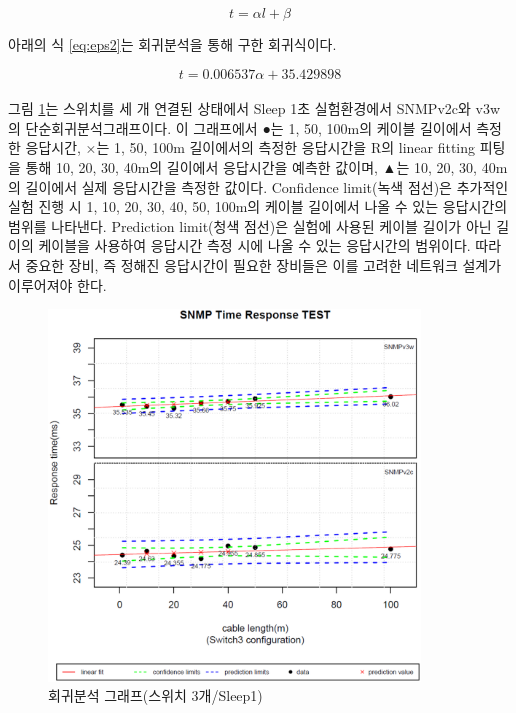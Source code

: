 \documentclass[11pt
  , a4paper
  , article
  , oneside
]{memoir}
\begin{document}
\begin{equation} \label{eq:eps}
  t=\alpha l + \beta  
\end{equation}

아래의 식 \ref{eq:eps2}는 회귀분석을 통해 구한 회귀식이다. 

\begin{equation} \label{eq:eps2}
  t=0.006537\alpha + 35.429898  
\end{equation}
\\
그림 \ref{fig:s3s1}는 스위치를 세 개 연결된 상태에서 Sleep 1초 실험환경에서 SNMPv2c와 v3w의 단순회귀분석그래프이다. 이 그래프에서 ●는 1, 50, 100m의 케이블 길이에서 측정한 응답시간, ×는 1, 50, 100m 길이에서의 측정한 응답시간을 R의 linear fitting 피팅을 통해 10, 20, 30, 40m의 길이에서 응답시간을 예측한 값이며, ▲는 10, 20, 30, 40m의 길이에서 실제 응답시간을 측정한 값이다. Confidence limit(녹색 점선)은 추가적인 실험 진행 시 1, 10, 20, 30, 40, 50, 100m의 케이블 길이에서 나올 수 있는 응답시간의 범위를 나타낸다. Prediction limit(청색 점선)은 실험에 사용된 케이블 길이가 아닌 길이의 케이블을 사용하여 응답시간 측정 시에 나올 수 있는 응답시간의 범위이다. 따라서 중요한 장비, 즉 정해진 응답시간이 필요한 장비들은 이를 고려한 네트워크 설계가 이루어져야 한다. 

\begin{figure}[!h]
  \centering
  \includegraphics[width=0.88\textwidth]{./images/s3s1.eps}
  \caption{회귀분석 그래프(스위치 3개/Sleep1)}
  \label{fig:s3s1}   
\end{figure}
\end{document}
